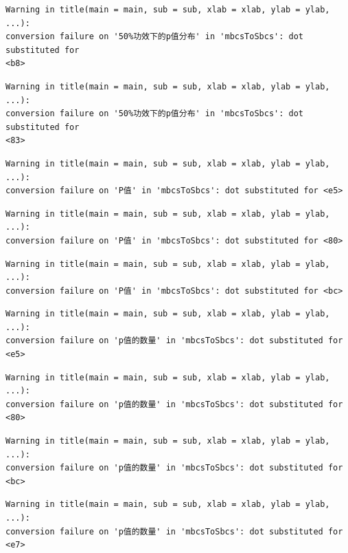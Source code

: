 \documentclass[
  letterpaper,
  DIV=11,
  numbers=noendperiod]{scrreprt}
\begin{document}
\begin{verbatim}
Warning in title(main = main, sub = sub, xlab = xlab, ylab = ylab, ...):
conversion failure on '50%功效下的p值分布' in 'mbcsToSbcs': dot substituted for
<b8>
\end{verbatim}

\begin{verbatim}
Warning in title(main = main, sub = sub, xlab = xlab, ylab = ylab, ...):
conversion failure on '50%功效下的p值分布' in 'mbcsToSbcs': dot substituted for
<83>
\end{verbatim}

\begin{verbatim}
Warning in title(main = main, sub = sub, xlab = xlab, ylab = ylab, ...):
conversion failure on 'P值' in 'mbcsToSbcs': dot substituted for <e5>
\end{verbatim}

\begin{verbatim}
Warning in title(main = main, sub = sub, xlab = xlab, ylab = ylab, ...):
conversion failure on 'P值' in 'mbcsToSbcs': dot substituted for <80>
\end{verbatim}

\begin{verbatim}
Warning in title(main = main, sub = sub, xlab = xlab, ylab = ylab, ...):
conversion failure on 'P值' in 'mbcsToSbcs': dot substituted for <bc>
\end{verbatim}

\begin{verbatim}
Warning in title(main = main, sub = sub, xlab = xlab, ylab = ylab, ...):
conversion failure on 'p值的数量' in 'mbcsToSbcs': dot substituted for <e5>
\end{verbatim}

\begin{verbatim}
Warning in title(main = main, sub = sub, xlab = xlab, ylab = ylab, ...):
conversion failure on 'p值的数量' in 'mbcsToSbcs': dot substituted for <80>
\end{verbatim}

\begin{verbatim}
Warning in title(main = main, sub = sub, xlab = xlab, ylab = ylab, ...):
conversion failure on 'p值的数量' in 'mbcsToSbcs': dot substituted for <bc>
\end{verbatim}

\begin{verbatim}
Warning in title(main = main, sub = sub, xlab = xlab, ylab = ylab, ...):
conversion failure on 'p值的数量' in 'mbcsToSbcs': dot substituted for <e7>
\end{verbatim}
\end{document}
